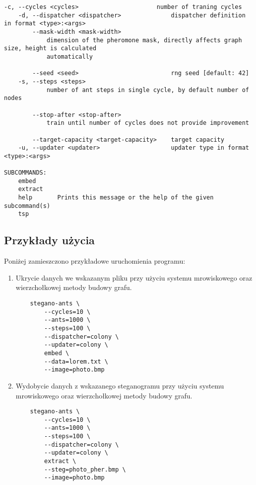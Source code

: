{{{\begin{lstlisting}[basicstyle=\tiny, caption=Pomoc programu, label=code:help]
    -c, --cycles <cycles>                      number of traning cycles
    -d, --dispatcher <dispatcher>              dispatcher definition in format <type>:<args>
        --mask-width <mask-width>
            dimension of the pheromone mask, directly affects graph size, height is calculated
            automatically

        --seed <seed>                          rng seed [default: 42]
    -s, --steps <steps>
            number of ant steps in single cycle, by default number of nodes

        --stop-after <stop-after>
            train until number of cycles does not provide improvement

        --target-capacity <target-capacity>    target capacity
    -u, --updater <updater>                    updater type in format <type>:<args>

SUBCOMMANDS:
    embed
    extract
    help       Prints this message or the help of the given subcommand(s)
    tsp
            \end{lstlisting}
        }

        \subsection{Przykłady użycia}
        {
            Poniżej zamieszczono przykładowe uruchomienia programu:

            \begin{enumerate}
                \item Ukrycie danych we wskazanym pliku przy użyciu systemu mrowiskowego oraz wierzchołkowej metody
                budowy grafu.

                \begin{lstlisting}
    stegano-ants \
        --cycles=10 \
        --ants=1000 \
        --steps=100 \
        --dispatcher=colony \
        --updater=colony \
        embed \
        --data=lorem.txt \
        --image=photo.bmp
                \end{lstlisting}

                \item Wydobycie danych z wskazanego steganogramu przy użyciu systemu mrowiskowego oraz wierzchołkowej
                metody budowy grafu.

                \begin{lstlisting}
    stegano-ants \
        --cycles=10 \
        --ants=1000 \
        --steps=100 \
        --dispatcher=colony \
        --updater=colony \
        extract \
        --steg=photo_pher.bmp \
        --image=photo.bmp
                \end{lstlisting}


\end{enumerate}}}}
